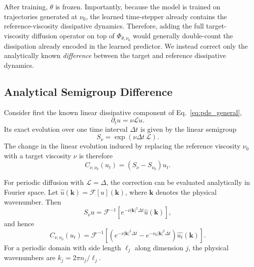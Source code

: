 \documentclass[10pt,twocolumn]{article}
\begin{document}
After training, $\theta$ is frozen. Importantly, because the model is trained
on trajectories generated at $\nu_0$, the learned time-stepper already contains
the reference-viscosity dissipative dynamics. Therefore, adding the full
target-viscosity diffusion operator on top of
$\Phi_{\theta,\nu_0}$ would generally double-count the dissipation already
encoded in the learned predictor. We instead correct only the analytically known
\emph{difference} between the target and reference dissipative dynamics.

\subsection{Analytical Semigroup Difference}
\label{sec:semigroup_difference}

Consider first the known linear dissipative component of
Eq.~\eqref{eq:pde_general},
\begin{equation}
    \partial_t u = \nu \mathcal{L}u.
\end{equation}
Its exact evolution over one time interval $\Delta t$ is given by the
linear semigroup
\begin{equation}
    S_\nu
    =
    \exp\!\left(\nu \Delta t\,\mathcal{L}\right).
    \label{eq:semigroup_general}
\end{equation}
The change in the linear evolution induced by replacing the reference
viscosity $\nu_0$ with a target viscosity $\nu$ is therefore
\begin{equation}
    C_{\nu,\nu_0}(u_t)
    =
    \left(S_\nu-S_{\nu_0}\right)u_t.
    \label{eq:delta_correction_general}
\end{equation}

For periodic diffusion with $\mathcal{L}=\Delta$, the correction can be evaluated
analytically in Fourier space. Let $\widehat{u}(\bm{k})=\mathcal{F}[u](\bm{k})$,
where $\bm{k}$ denotes the physical wavenumber. Then
\begin{equation}
    S_\nu u
    =
    \mathcal{F}^{-1}
    \left[
        e^{-\nu |\bm{k}|^2\Delta t}
        \widehat{u}(\bm{k})
    \right],
    \label{eq:diffusion_semigroup}
\end{equation}
and hence
\begin{equation}
    C_{\nu,\nu_0}(u_t)
    =
    \mathcal{F}^{-1}
    \left[
        \left(
        e^{-\nu |\bm{k}|^2\Delta t}
        -
        e^{-\nu_0 |\bm{k}|^2\Delta t}
        \right)
        \widehat{u_t}(\bm{k})
    \right].
    \label{eq:delta_fourier}
\end{equation}
For a periodic domain with side length $\ell_j$ along dimension $j$, the
physical wavenumbers are $k_j=2\pi n_j/\ell_j$.
\end{document}
